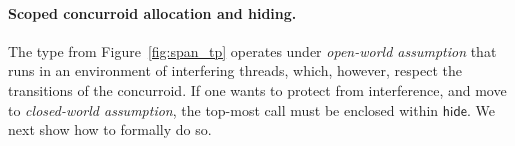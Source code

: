 

\paragraph{Scoped concurroid allocation and hiding.~~}

The  type from Figure~\ref{fig:span_tp} operates under
\emph{open-world assumption} that  runs in an environment
of interfering threads, which, however, respect the transitions of the
 concurroid. If one wants to protect  from
interference, and move to \emph{closed-world assumption}, the top-most
call must be enclosed within $\mathsf{hide}$. We next show how to
formally do so.

